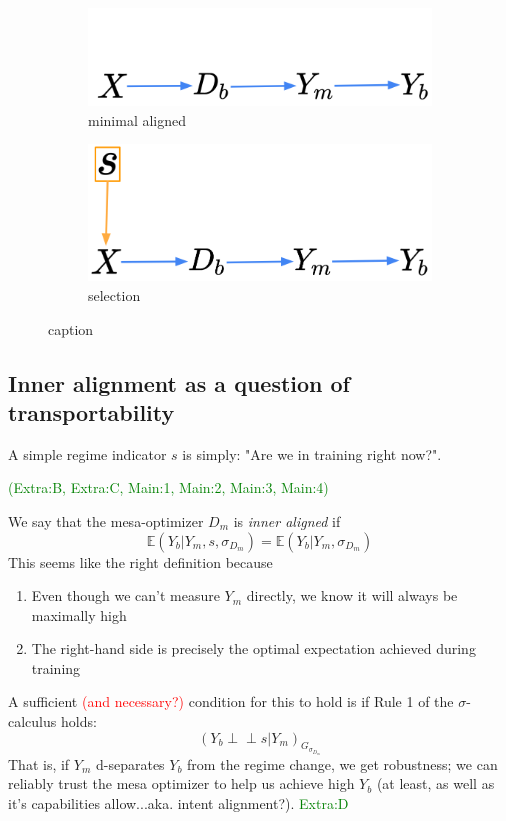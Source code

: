 \documentclass[letterpaper,10pt]{article}
\newcommand\indep{\perp \!\!\! \perp}
\newcommand\E{\mathbb{E}}
\begin{document}
\begin{figure}
\centering
\begin{subfigure}{.5\textwidth}
  \centering
    \includegraphics[width=.6\linewidth]{pics/my_own/minimal_aligned.png}
    \caption{minimal aligned}
    \label{fig:minimal-aligned}
\end{subfigure}%
\begin{subfigure}{.5\textwidth}
  \centering
    \includegraphics[width=.6\linewidth]{pics/my_own/minimal_selection.png}
    \caption{selection}
    \label{fig:minimal-selection}
\end{subfigure}
\caption{caption}
\label{fig:selection}
\end{figure}

\subsection{Inner alignment as a question of transportability}

A simple regime indicator $s$ is simply: "Are we in training right now?".

\textcolor{green}{(Extra:B, Extra:C, Main:1, Main:2, Main:3, Main:4)}

We say that the mesa-optimizer $D_m$ is \emph{inner aligned} if 
\[
\E(Y_b|Y_m,s,\sigma_{D_m}) = \E(Y_b|Y_m,\sigma_{D_m})
\]
This seems like the right definition because 
\begin{enumerate}
  \item Even though we can't measure $Y_m$ directly, we know it will always be maximally high
  \item The right-hand side is precisely the optimal expectation achieved during training
\end{enumerate}

A sufficient \textcolor{red}{(and necessary?)} condition for this to hold is if Rule 1 of the $\sigma$-calculus holds:
\[
(Y_b\indep s|Y_m)_{G_{\sigma_{D_m}}}
\]
That is, if $Y_m$ d-separates $Y_b$ from the regime change, we get robustness; we can reliably trust the mesa optimizer to help us achieve high $Y_b$ (at least, as well as it's capabilities allow...aka. intent alignment?).
\textcolor{green}{Extra:D}
\end{document}
